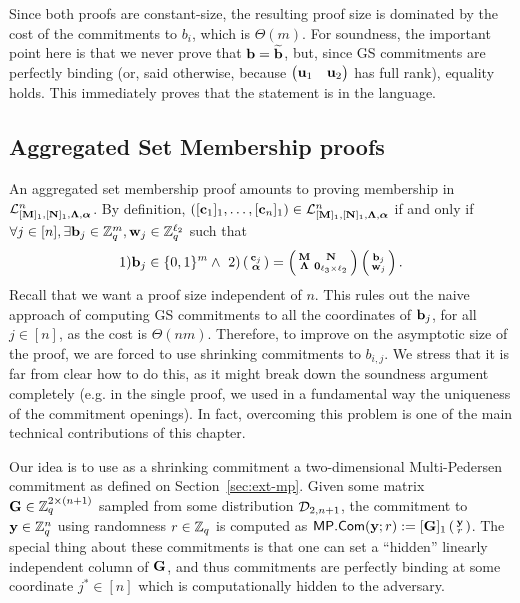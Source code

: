 Since both proofs are constant-size, the resulting proof size is dominated by the cost of the commitments to $b_i$, which is $\Theta(m)$. 
For soundness, the important point here is that we never prove that $\mathbf{b}=\widetilde{\mathbf{b}}$, but, since GS commitments are perfectly binding (or, said otherwise, because $\begin{pmatrix} \mathbf{u}_1 &   \mathbf{u}_2 \end{pmatrix}$
has full rank), equality holds. This immediately proves that the statement is in the language.  
\subsection{Aggregated Set Membership proofs}
An aggregated set membership proof amounts to proving membership in $\mathcal{L}_{[\mathbf{{M}}]_1,[\mathbf{{N}}]_1,\mathbf{{\Lambda}},{\boldsymbol \alpha}}^n$. By definition, $([\mathbf{c}_1]_1,\ldots, [\mathbf{c}_n]_1) \in\mathcal{L}_{[\mathbf{{M}}]_1,[\mathbf{{N}}]_1,\mathbf{{\Lambda}},{\boldsymbol \alpha}}^n$ if and only if  $\forall j \in [n], \exists \mathbf{b}_j\in \mathbb{Z}_q^{m},\mathbf{w}_j\in\mathbb{Z}_q^{\ell_2}$ such that
$$
 1) \mathbf{b}_j\in \{0,1\}^{m}
  \wedge \ 2)
\left(\begin{smallmatrix}
    \mathbf{c}_j\\
    {\boldsymbol \alpha}
\end{smallmatrix}\right)
=
\left(\begin{smallmatrix}
    \mathbf{{M}}       & \mathbf{{N}}\\
    \mathbf{{\Lambda}} & \mathbf{{0}}_{{\ell_3}\times {\ell_2}}
\end{smallmatrix}\right)
\left(\begin{smallmatrix}
    \mathbf{b}_j\\
    \mathbf{w}_j
\end{smallmatrix}\right).
$$
Recall that we want a proof size independent of $n$. This rules out the naive approach of computing GS commitments to all the coordinates of $\mathbf{b}_j$, for all $j \in [n]$, as the cost is $\Theta(nm)$. Therefore, to improve on the asymptotic size of the proof, we are forced to use shrinking commitments to $b_{i,j}$. We stress that it is far from clear how to do this, as it might break down the soundness argument completely (e.g. in the single proof, we used in a fundamental way the uniqueness of the commitment openings). In fact, overcoming this problem is one of the main technical contributions of this chapter. 

Our idea is to use as a shrinking commitment a two-dimensional Multi-Pedersen commitment as defined on Section~\ref{sec:ext-mp}. Given some matrix $\mathbf{{G}} \in \mathbb{Z}_q^{2 \times (n+1)}$ sampled from some distribution $\mathcal{D}_{2,n+1}$, the commitment to $\mathbf{y}\in\mathbb{Z}_q^n$ using randomness $r\in\mathbb{Z}_q$ is computed as $\mathsf{MP}.\mathsf{Com}(\mathbf{y};r):=[\mathbf{{G}}]_1 \left(\begin{smallmatrix}\mathbf{y} \\ r\end{smallmatrix}\right)$. The special thing about these commitments is that one can set a ``hidden'' linearly independent column of 
$\mathbf{{G}}$, and thus commitments are perfectly binding at some coordinate $j^*\in[n]$ which is computationally hidden to the adversary.

